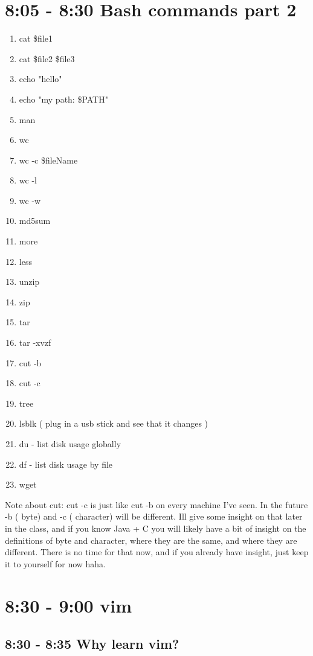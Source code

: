 \documentclass[10pt]{article}
\begin{document}
\section{8:05 - 8:30 Bash commands part 2}
\begin{multicols}{4}
\begin{enumerate}
\item cat \$file1
\item cat \$file2 \$file3
\item echo "hello"
\item echo "my path: \$PATH"
\item man
\item wc
\item wc -c \$fileName
\item wc -l
\item wc -w
\item md5sum
\item more
\item less
\item unzip
\item zip
\item tar
\item tar -xvzf
\item cut -b
\item cut -c 
\item tree
\item lsblk ( plug in a usb stick and see that it changes )
\item du - list disk usage globally
\item df - list disk usage by file
\item wget
\end{enumerate}
\end{multicols}

Note about cut: cut -c is just like cut -b on every machine I've seen. In the future -b ( byte) and -c ( character) will be different. Ill give some insight on that later in the class, and if you know Java + C you will likely have a bit of insight on the definitions of byte and character, where they are the same, and where they are different. There is no time for that now, and if you already have insight, just keep it to yourself for now haha.

\section*{8:30 - 9:00 vim}
\subsection{8:30 - 8:35 Why learn vim?}
\end{document}
